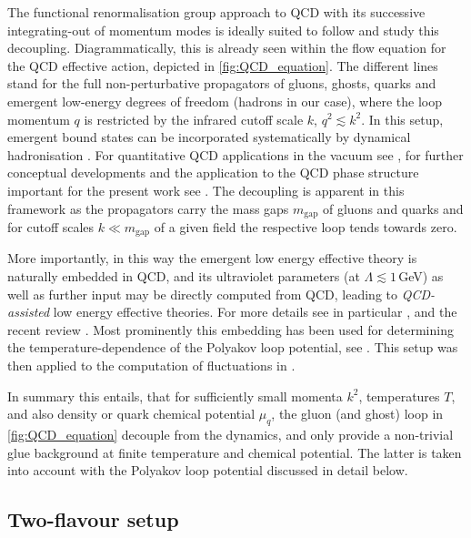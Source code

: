 \documentclass[%
reprint,
superscriptaddress,
showpacs,preprintnumbers,
amsmath,amssymb,
aps,
prd,
]{revtex4-1}
\begin{document}
The functional renormalisation group approach to QCD with its successive integrating-out of momentum modes is ideally suited to follow and study this decoupling. Diagrammatically, this is already seen within the flow equation for the QCD effective action, depicted in \autoref{fig:QCD_equation}. The different lines stand for the full non-perturbative propagators of gluons, ghosts, quarks and emergent low-energy degrees of freedom (hadrons in our case), where the loop momentum $q$ is restricted by the infrared cutoff scale $k$, $q^2\lesssim k^2$. In this setup, emergent bound states can be incorporated systematically by dynamical hadronisation \cite{Gies:2001nw, Gies:2002hq, Pawlowski:2005xe, Floerchinger:2009uf}. For quantitative QCD applications in the vacuum see \cite{Braun:2014ata, Rennecke:2015eba, Mitter:2014wpa, Cyrol:2017ewj}, for further conceptual developments and the application to the QCD phase structure important for the present work see \cite{Fu:2019hdw}. The decoupling is apparent in this framework as the propagators carry the mass gaps $m_\textrm{gap}$ of gluons and quarks and for cutoff scales $k\ll m_\textrm{gap}$ of a given field the respective loop tends towards zero. 
	
More importantly, in this way the emergent low energy effective theory is naturally embedded in QCD, and its ultraviolet parameters (at $\Lambda\lesssim1$\,GeV) as well as further input may be directly computed from QCD, leading to \textit{QCD-assisted} low energy effective theories. For more details see in particular \cite{Fu:2019hdw}, and the recent review \cite{Dupuis:2020fhh}. Most prominently this embedding has been used for determining the temperature-dependence of the Polyakov loop potential, see \cite{Haas:2013qwp, Herbst:2013ufa}. This setup was then applied to the computation of fluctuations in \cite{Fu:2015amv, Fu:2015naa, Fu:2016tey, Wen:2018nkn, Yin:2019ebz}. 
	
	
In summary this entails, that for sufficiently small momenta $k^2$, temperatures $T$, and also density or quark chemical potential $\mu_q$, the gluon (and ghost) loop in \autoref{fig:QCD_equation} decouple from the dynamics, and only provide a non-trivial glue background at finite temperature and chemical potential. The latter is taken into account with the Polyakov loop potential discussed in detail below. 
	
\subsection{Two-flavour setup}\label{sec:Nf2LEFT}
\end{document}
